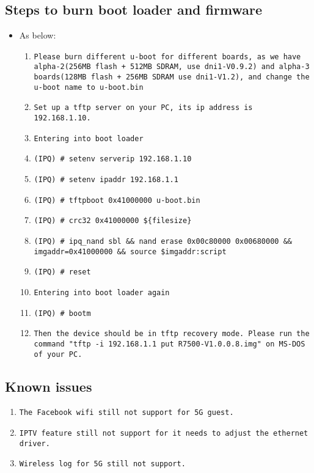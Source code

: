\documentclass[12pt]{report}
\begin{document}
    \subsection{Steps to burn boot loader and firmware}
    \begin{itemize}
    \item As below:
            \begin{enumerate}
	    	\item \texttt{Please burn different u-boot for different boards, as we have alpha-2(256MB flash + 512MB SDRAM, use dni1-V0.9.2) and alpha-3 boards(128MB flash + 256MB SDRAM use dni1-V1.2), and change the u-boot name to u-boot.bin}
		\item \texttt{Set up a tftp server on your PC, its ip address is 192.168.1.10.}
		\item \texttt{Entering into boot loader}
		\item \texttt{(IPQ) \# setenv serverip 192.168.1.10}
		\item \texttt{(IPQ) \# setenv ipaddr 192.168.1.1}
		\item \texttt{(IPQ) \# tftpboot 0x41000000 u-boot.bin}
		\item \texttt{(IPQ) \# crc32 0x41000000 \$\{filesize\}}
		\item \texttt{(IPQ) \# ipq\_nand sbl \&\& nand erase 0x00c80000 0x00680000 \&\& imgaddr=0x41000000 \&\& source \$imgaddr:script}
		\item \texttt{(IPQ) \# reset}
		\item \texttt{Entering into boot loader again}
		\item \texttt{(IPQ) \# bootm}
		\item \texttt{Then the device should be in tftp recovery mode. Please run the command "tftp -i 192.168.1.1 put R7500-V1.0.0.8.img" on MS-DOS of your PC.}
            \end{enumerate}
    \end{itemize}

\subsection{Known issues}
            \begin{enumerate}
		\item \texttt{The Facebook wifi still not support for 5G guest.}
		\item \texttt{IPTV feature still not support for it needs to adjust the ethernet driver.}
		\item \texttt{Wireless log for 5G still not support.}
            \end{enumerate}
\end{document}
